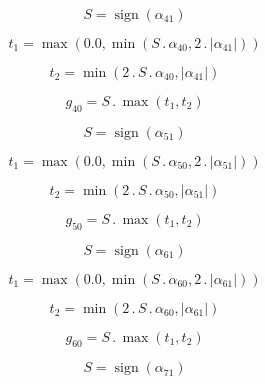 \documentclass{article}
\begin{document}
\begin{dmath}S = \operatorname{sign}{\left (\alpha_{41} \right )}\end{dmath}

\begin{dmath}t_{1} = \max\left(0.0, \min\left(S \,.\, \alpha_{40}, 2 \,.\, \left|{\alpha_{41}}\right|\right)\right)\end{dmath}

\begin{dmath}t_{2} = \min\left(2 \,.\, S \,.\, \alpha_{40}, \left|{\alpha_{41}}\right|\right)\end{dmath}

\begin{dmath}g_{40} = S \,.\, \max\left(t_{1}, t_{2}\right)\end{dmath}

\begin{dmath}S = \operatorname{sign}{\left (\alpha_{51} \right )}\end{dmath}

\begin{dmath}t_{1} = \max\left(0.0, \min\left(S \,.\, \alpha_{50}, 2 \,.\, \left|{\alpha_{51}}\right|\right)\right)\end{dmath}

\begin{dmath}t_{2} = \min\left(2 \,.\, S \,.\, \alpha_{50}, \left|{\alpha_{51}}\right|\right)\end{dmath}

\begin{dmath}g_{50} = S \,.\, \max\left(t_{1}, t_{2}\right)\end{dmath}

\begin{dmath}S = \operatorname{sign}{\left (\alpha_{61} \right )}\end{dmath}

\begin{dmath}t_{1} = \max\left(0.0, \min\left(S \,.\, \alpha_{60}, 2 \,.\, \left|{\alpha_{61}}\right|\right)\right)\end{dmath}

\begin{dmath}t_{2} = \min\left(2 \,.\, S \,.\, \alpha_{60}, \left|{\alpha_{61}}\right|\right)\end{dmath}

\begin{dmath}g_{60} = S \,.\, \max\left(t_{1}, t_{2}\right)\end{dmath}

\begin{dmath}S = \operatorname{sign}{\left (\alpha_{71} \right )}\end{dmath}
\end{document}
